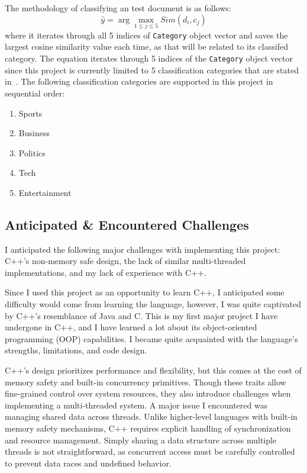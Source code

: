 \documentclass[conference]{IEEEtran}
\newcommand{\code}[1]{\lstinline[basicstyle=\ttfamily]|#1|}
\begin{document}
The methodology of classifying an test document is as follows:
\begin{equation}
    \hat{y} = \arg\max_{1 \leq j \leq 5} \textit{Sim}(d_i, c_j)
\end{equation}
where it iterates through all 5 indices of \code{Category} object vector and saves the largest cosine similarity value each time, as that will be related to its classifed category. The equation iterates through 5 indices of the \code{Category} object vector since this project is currently limited to 5 classification categories that are stated in~\cite{b6}. The following classification categories are supported in this project in sequential order:
\begin{enumerate}
    \item Sports
    \item Business
    \item Politics
    \item Tech
    \item Entertainment
\end{enumerate}
    



\subsection{Anticipated \& Encountered Challenges}
I anticipated the following major challenges with implementing this project: C++’s non-memory safe design, the lack of similar multi-threaded implementations, and my lack of experience with C++.

Since I used this project as an opportunity to learn C++, I anticipated some difficulty would come from learning the language, however, I was quite captivated by C++’s resemblance of Java and C. This is my first major project I have undergone in C++, and I have learned a lot about its object-oriented programming (OOP) capabilities. I became quite acquainted with the language’s strengths, limitations, and code design.

C++’s design prioritizes performance and flexibility, but this comes at the cost of memory safety and built-in concurrency primitives. Though these traits allow fine-grained control over system resources, they also introduce challenges when implementing a multi-threaded system. A major issue I encountered was managing shared data across threads. Unlike higher-level languages with built-in memory safety mechanisms, C++ requires explicit handling of synchronization and resource management. Simply sharing a data structure across multiple threads is not straightforward, as concurrent access must be carefully controlled to prevent data races and undefined behavior.
\end{document}
